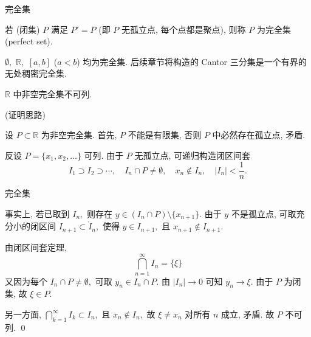 \begin{frame}{完全集}

\begin{Def}[完全集]
若 (闭集) $P$ 满足 $P' = P$ (即 $P$ 无孤立点, 每个点都是聚点), 则称 $P$ 为\alert{完全集} (perfect set).
\end{Def}

\pause
\vspace{0.5em}

\begin{eg}
$\emptyset,$ $\mathbb{R},$ $[a, b]$ ($a < b$) 均为完全集. 后续章节将构造的 \alert{Cantor 三分集}是一个有界的无处稠密完全集.
\end{eg}

\pause
\vspace{0.5em}

\begin{thm}
$\mathbb{R}$ 中非空完全集不可列.
\end{thm}

\pause
\vspace{0.3em}

\startproof[bg=yellow, fg=red](证明思路)
\vspace{0.3em}

设 $P \subset \mathbb{R}$ 为非空完全集. 首先, $P$ 不能是有限集, 否则 $P$ 中必然存在孤立点, 矛盾.

\vspace{0.5em}

反设 $P = \{x_1, x_2, \ldots\}$ 可列. 由于 $P$ 无孤立点, 可递归构造闭区间套
\[
I_1 \supset I_2 \supset \cdots,
\quad
I_n \cap P \neq \emptyset,
\quad
x_n \notin I_n,
\quad
|I_n| < \frac1n.
\]

\end{frame}


\begin{frame}{完全集}

事实上, 若已取到 $I_n,$ 则存在 $y \in (I_n \cap P)\setminus \{x_{n+1}\}.$ 由于 $y$ 不是孤立点, 可取充分小的闭区间 $I_{n+1} \subset \mathring{I}_n,$ 使得 $y \in I_{n+1},$ 且 $x_{n+1} \notin I_{n+1}.$

\pause
\vspace{0.5em}

由闭区间套定理,
\[
\bigcap_{n=1}^{\infty} I_n = \{\xi\}
\]
又因为每个 $I_n \cap P \neq \emptyset,$ 可取 $y_n \in I_n \cap P.$ 由 $|I_n| \to 0$ 可知 $y_n \to \xi.$ 由于 $P$ 为闭集, 故 $\xi \in P.$

\pause
\vspace{0.5em}

另一方面, $\bigcap_{k=1}^{\infty} I_k \subset I_n,$ 且 $x_n \notin I_n,$ 故 $\xi \neq x_n$ 对所有 $n$ 成立, 矛盾. 故 $P$ 不可列.
\qed

\end{frame}

